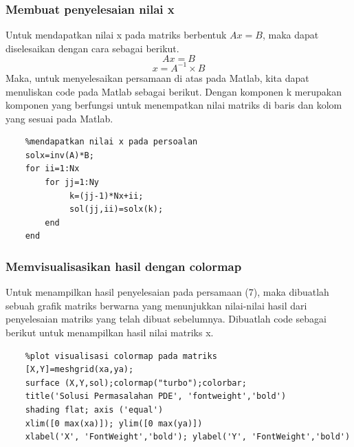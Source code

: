 \documentclass{article}
\begin{document}
\subsubsection{Membuat penyelesaian nilai x}
Untuk mendapatkan nilai x pada matriks berbentuk \(Ax=B\), maka dapat diselesaikan dengan cara sebagai berikut.
    \[Ax=B\]
\begin{equation}
    x=A^{-1} \times B
\end{equation}
Maka, untuk menyelesaikan persamaan di atas pada Matlab, kita dapat menuliskan code pada Matlab sebagai berikut. Dengan komponen k merupakan komponen yang berfungsi untuk menempatkan nilai matriks di baris dan kolom yang sesuai pada Matlab.
\begin{lstlisting}
    %mendapatkan nilai x pada persoalan
    solx=inv(A)*B; 
    for ii=1:Nx
        for jj=1:Ny
             k=(jj-1)*Nx+ii;
             sol(jj,ii)=solx(k);
        end
    end
\end{lstlisting}

\subsubsection{Memvisualisasikan hasil dengan colormap}
Untuk menampilkan hasil penyelesaian pada persamaan (7), maka dibuatlah sebuah grafik matriks berwarna yang menunjukkan nilai-nilai hasil dari penyelesaian matriks yang telah dibuat sebelumnya. Dibuatlah code sebagai berikut untuk menampilkan hasil nilai matriks x.
\begin{lstlisting}
    %plot visualisasi colormap pada matriks
    [X,Y]=meshgrid(xa,ya);
    surface (X,Y,sol);colormap("turbo");colorbar; 
    title('Solusi Permasalahan PDE', 'fontweight','bold')
    shading flat; axis ('equal')
    xlim([0 max(xa)]); ylim([0 max(ya)])
    xlabel('X', 'FontWeight','bold'); ylabel('Y', 'FontWeight','bold')
\end{lstlisting}

\newpage
\end{document}
